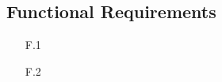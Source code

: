 \subsection{Functional Requirements}

\begin{enumerate}
    \item[F.1]
    \item[F.2]
\end{enumerate}